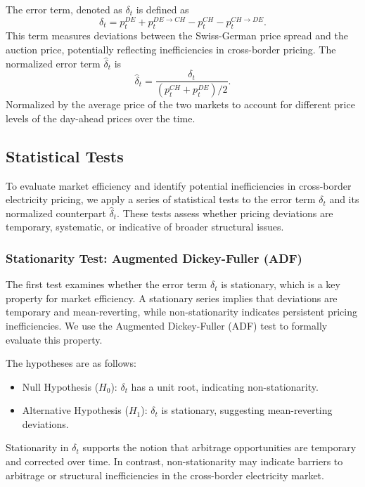 \documentclass[12pt]{article}
\begin{document}
The error term, denoted as $\delta_t$ is defined as
\begin{equation}
    \delta_t = p_t^{DE} + p_t^{DE \rightarrow CH} - p_t^{CH} - p_t^{CH \rightarrow DE}.
\end{equation}
This term measures deviations between the Swiss-German price spread and the auction price, potentially reflecting inefficiencies in cross-border pricing. \newline
The normalized error term $\hat{\delta}_t$ is 
\begin{equation}
    \hat{\delta}_t = \frac{\delta_t}{(p_t^{CH} + p_t^{DE})/2}.
\end{equation}
Normalized by the average price of the two markets to account for different price levels of the day-ahead prices over the time. 

\subsection{Statistical Tests}

To evaluate market efficiency and identify potential inefficiencies in cross-border electricity pricing, we apply a series of statistical tests to the error term $\delta_t$ and its normalized counterpart $\hat{\delta}_t$. These tests assess whether pricing deviations are temporary, systematic, or indicative of broader structural issues.

\subsubsection*{Stationarity Test: Augmented Dickey-Fuller (ADF)}

The first test examines whether the error term $\delta_t$ is stationary, which is a key property for market efficiency. A stationary series implies that deviations are temporary and mean-reverting, while non-stationarity indicates persistent pricing inefficiencies. We use the Augmented Dickey-Fuller (ADF) test to formally evaluate this property.

The hypotheses are as follows:
\begin{itemize}
    \item Null Hypothesis ($H_0$): $\delta_t$ has a unit root, indicating non-stationarity.
    \item Alternative Hypothesis ($H_1$): $\delta_t$ is stationary, suggesting mean-reverting deviations.
\end{itemize}

Stationarity in $\delta_t$ supports the notion that arbitrage opportunities are temporary and corrected over time. In contrast, non-stationarity may indicate barriers to arbitrage or structural inefficiencies in the cross-border electricity market.
\end{document}
